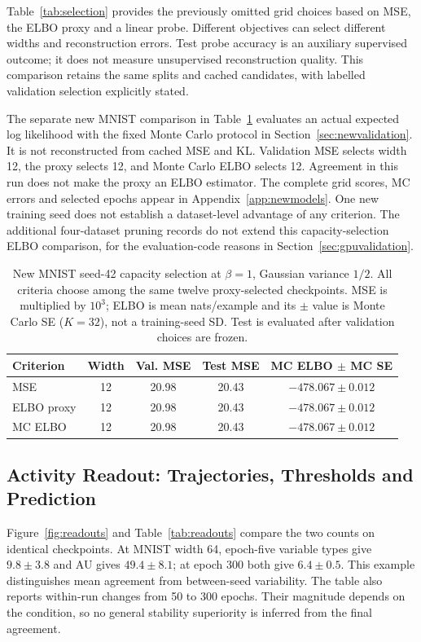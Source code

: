 \documentclass[make,article,submit,pdftex,moreauthors]{Definitions/mdpi}
\begin{document}
Table~\ref{tab:selection} provides the previously omitted grid choices
based on MSE, the ELBO proxy and a linear probe. Different objectives can
select different widths and reconstruction errors. Test probe accuracy
is an auxiliary supervised outcome; it does not measure unsupervised
reconstruction quality. This comparison retains the same splits and
cached candidates, with labelled validation selection explicitly stated.

The separate new MNIST comparison in Table~\ref{tab:mcselection}
evaluates an actual expected log likelihood with the fixed Monte Carlo
protocol in Section~\ref{sec:newvalidation}. It is not reconstructed
from cached MSE and KL. Validation MSE selects width 12, the proxy selects 12, and Monte Carlo ELBO selects 12. Agreement in this run does not make the proxy an ELBO estimator.
The complete grid scores, MC errors and selected epochs appear in
Appendix~\ref{app:newmodels}. One new training seed does not establish
a dataset-level advantage of any criterion. The additional four-dataset
pruning records do not extend this capacity-selection ELBO comparison,
for the evaluation-code reasons in Section~\ref{sec:gpuvalidation}.

\begin{table}[H]
\caption{New MNIST seed-42 capacity selection at $\beta=1$, Gaussian variance $1/2$. All criteria choose among the same twelve proxy-selected checkpoints. MSE is multiplied by $10^3$; ELBO is mean nats/example and its $\pm$ value is Monte Carlo SE ($K=32$), not a training-seed SD. Test is evaluated after validation choices are frozen.}\label{tab:mcselection}
\small
\setlength{\tabcolsep}{3pt}
\begin{tabular*}{\textwidth}{@{\extracolsep{\fill}}lcccc@{}}
\toprule
Criterion & Width & Val. MSE & Test MSE & MC ELBO $\pm$ MC SE \\
\midrule
MSE & 12 & 20.98 & 20.43 & $-478.067 \pm 0.012$ \\
ELBO proxy & 12 & 20.98 & 20.43 & $-478.067 \pm 0.012$ \\
MC ELBO & 12 & 20.98 & 20.43 & $-478.067 \pm 0.012$ \\
\bottomrule\end{tabular*}
\end{table}


\subsection{Activity Readout: Trajectories, Thresholds and Prediction}\label{sec:au}
Figure~\ref{fig:readouts} and Table~\ref{tab:readouts} compare the two
counts on identical checkpoints. At MNIST width 64, epoch-five variable
types give $9.8\pm3.8$ and AU gives $49.4\pm8.1$; at epoch 300 both
give $6.4\pm0.5$. This example distinguishes mean agreement from
between-seed variability. The table also reports within-run changes from
50 to 300 epochs. Their magnitude depends on the condition, so no
general stability superiority is inferred from the final agreement.
\end{document}
